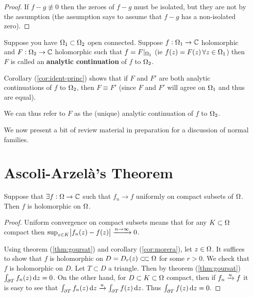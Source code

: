 \begin{proof}
If $f-g \not\equiv 0$ then the zeroes of $f-g$ must be isolated, but they are not by the assumption (the assumption says to assume that $f-g$ has a non-isolated zero).
\end{proof}

\begin{definition}
Suppose you have $\Omega_1 \subset \Omega_2 $ open connected. Suppose $f: \Omega_1 \to \mathbb{C}$ holomorphic and $F: \Omega_2 \to \mathbb{C}$ holomorphic such that $f = F |_{\Omega_1}$ (ie $f(z) = F(z) \, \forall z \in \Omega_1$) then $F$ is called an \textbf{analytic continuation} of $f$ to $\Omega_2$.

\end{definition}


\begin{note}

Corollary (\ref{cor:ident-princ}) shows that if $F$ and $F'$ are both analytic continuations of $f$ to $\Omega_2$, then $F \equiv F'$ (since $F$ and $F'$ will agree on $\Omega_1$ and thus are equal).

We can thus refer to $F$ as the (unique) analytic continuation of $f$ to $\Omega_2$.
\end{note}

We now present a bit of review material in preparation for a discussion of normal families.

\section{Ascoli-Arzelà's Theorem}

\begin{proposition}
Suppose that $\exists f:\Omega \rightarrow \mathbb{C}$ such that $f_n \to f$ uniformly on compact subsets of $\Omega$. Then $f$ is holomorphic on $\Omega$.
\end{proposition}


\begin{proof}
Uniform convergence on compact subsets means that for any $K \subset \Omega$ compact then $\sup_{z\in K} \abs{f_n(z) - f(z)} \xrightarrow[]{n \to \infty} 0$. 

Using theorem (\ref{thm:goursat}) and corollary (\ref{cor:morera}), let $z\in \Omega$. It suffices to show that $f$ is holomorphic on $D=D_r(z) \ssubset \om $ for some $r>0$. We check that $f$ is holomorphic on $D$. Let $T \subset D$ a triangle. Then by theorem (\ref{thm:goursat}) $\int_{\partial T} f_n(z) \dif z =  0$. On the other hand, for $D \subset K \subset \Omega$ compact, then if $f_n \xrightarrow[]{u} f$ it is easy to see that $\int_{\partial T} f_n(z) \dif z \tou \int_{\partial T} f(z) \dif z$. Thus $\int_{\partial T} f(z) \dif z = 0$.
\end{proof}

